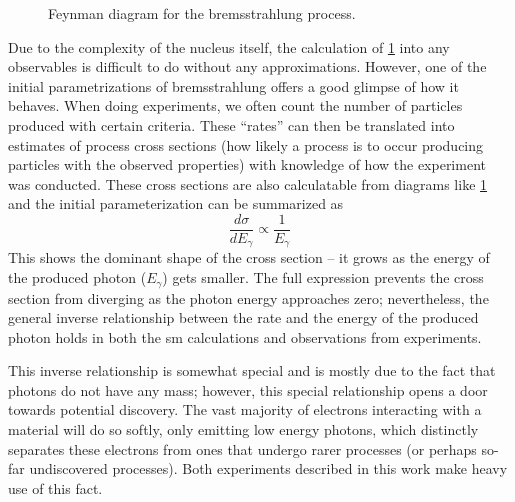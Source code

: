 \begin{figure}
  \centering
  \caption{
    Feynman diagram for the bremsstrahlung process.
  }
  \label{fig:brem-feynman}
\end{figure}

Due to the complexity of the nucleus itself, the calculation of \cref{fig:brem-feynman} into
any observables is difficult to do without any approximations. However, one of the initial parametrizations of
bremsstrahlung offers a good glimpse of how it behaves.
When doing experiments, we often count the number of particles produced with certain criteria.
These ``rates'' can then be translated into estimates of process cross sections (how likely a process
is to occur producing particles with the observed properties) with knowledge of
how the experiment was conducted. These cross sections are also calculatable from diagrams like
\cref{fig:brem-feynman} and the initial parameterization can be summarized as
\[
  \frac{d\sigma}{d E_\gamma} \propto \frac{1}{E_\gamma}
\]
This shows the dominant shape of the cross section 
-- it grows as the energy of the produced photon
(\(E_\gamma\)) gets smaller. The full expression prevents the cross section from diverging as the
photon energy approaches zero; nevertheless, the general inverse relationship between the rate and
the energy of the produced photon holds in both the \ac{sm} calculations and observations from
experiments.

This inverse relationship is somewhat special and is mostly due to the fact that photons
do not have any mass; however, this special relationship opens a door towards potential
discovery. The vast majority of electrons interacting with a material will do so softly,
only emitting low energy photons, which distinctly separates these electrons from ones
that undergo rarer processes (or perhaps so-far undiscovered processes). Both experiments
described in this work make heavy use of this fact.


